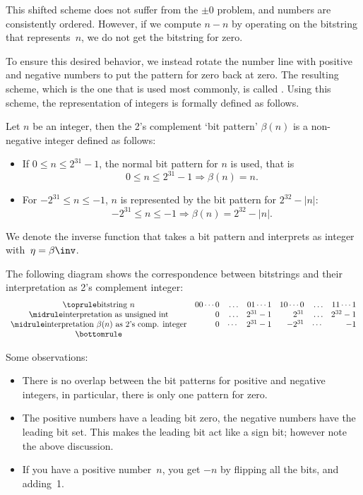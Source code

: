 This shifted scheme does not suffer from the $\pm0$ problem, and
numbers are consistently ordered. However, if we compute $n-n$
by operating on the bitstring that represents~$n$, we do not 
get the bitstring for zero.

To ensure this desired behavior,
we instead rotate the number line with positive and negative numbers
to put the pattern for zero back at zero.
The resulting scheme, which is the one that is used most commonly, is
called . Using this scheme,
the representation of integers is
formally defined as follows.
\begin{definition}
  Let $n$ be an integer, then the 2's complement `bit pattern'
  $\beta(n)$ is a non-negative integer defined as follows:
  \begin{itemize}
  \item If $0\leq n\leq 2^{31}-1$, the normal bit pattern for $n$ is
    used, that is
    \begin{equation}
      0\leq n\leq 2^{31}-1 \Rightarrow \beta(n) = n.
    \end{equation}
  \item For $-2^{31}\leq n\leq -1$, $n$ is represented by the bit
    pattern for $2^{32}-|n|$:
    \begin{equation}
      -2^{31}\leq n\leq -1 \Rightarrow \beta(n) = 2^{32}-|n|.
    \end{equation}
  \end{itemize}
  We denote the inverse function that takes a bit pattern and
  interprets as integer with~$\eta=\beta\inv$.
\end{definition}

The following diagram shows the correspondence between bitstrings and
their interpretation as 2's complement integer:
\begin{equation}
\begin{array}{crrrrrr}
  \toprule
  \hbox{bitstring $n$}&
  00\cdots0&\ldots&01\cdots1&
  10\cdots0&\ldots&11\cdots1\\ \midrule
  \hbox{interpretation as unsigned int}&
  0&\ldots&2^{31}-1&
  2^{31}&\ldots&2^{32}-1\\ \midrule
  \hbox{interpretation $\beta(n)$ as 2's comp. integer}&
  0&\cdots&2^{31}-1&
  -2^{31}&\cdots&-1\\
  \bottomrule
\end{array}
\end{equation}

Some observations:
\begin{itemize}
\item There is no overlap between the bit patterns for positive and
  negative integers, in particular, there is only one pattern for zero.
\item The positive numbers have a leading bit zero, the negative
  numbers have the leading bit set.
  This makes the leading bit act like a sign bit; however note the
  above discussion.
\item If you have a positive number~$n$, you get $-n$ by flipping
  all the bits, and adding~1.
\end{itemize}


